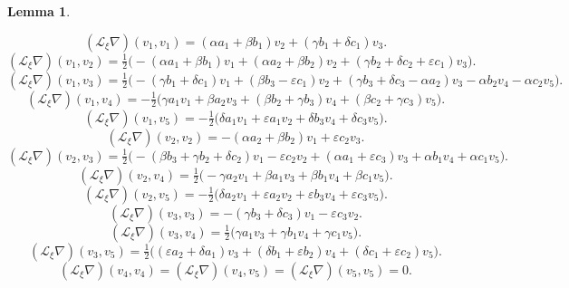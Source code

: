 \documentclass[10pt]{article}
\newtheorem{Lemma}{Lemma}
\begin{document}
\begin{Lemma}
\begin{enumerate}
\begin{equation}
(\mathscr{L}_\xi\nabla) (v_1,v_1)=(\alpha a_1+\beta b_1)v_2+(\gamma b_1+\delta c_1)v_3.\label{A(v_1,v_1)}    
\end{equation} 
\begin{equation}
 (\mathscr{L}_\xi\nabla) (v_1,v_2)=\tfrac{1}{2}\Big(-(\alpha a_1+\beta b_1)v_1+(\alpha a_2+\beta b_2)v_2+(\gamma b_2+\delta c_2+\varepsilon c_1)v_3\Big).   
\end{equation}
\begin{equation}
(\mathscr{L}_\xi\nabla) (v_1,v_3)=\tfrac{1}{2}\Big(-(\gamma b_1 +\delta c_1)v_1+(\beta b_3-\varepsilon c_1)v_2+(\gamma b_3+\delta c_3-\alpha a_2)v_3-\alpha b_2v_4-\alpha c_2 v_5\Big).\label{A(v_1,v_3)}
\end{equation}
\begin{equation}
 (\mathscr{L}_\xi\nabla) (v_1,v_4)=-\tfrac{1}{2}\Big(\gamma a_1 v_1+\beta a_2v_3+(\beta b_2+\gamma b_3)v_4+(\beta c_2+\gamma c_3) v_5\Big).   
\end{equation}
\begin{equation}   
(\mathscr{L}_\xi\nabla) (v_1,v_5)=-\tfrac{1}{2}\Big(\delta a_1 v_1+\varepsilon a_1v_2+\delta b_3v_4+\delta c_3v_5\Big).
\end{equation} 
\begin{equation}
    (\mathscr{L}_\xi\nabla) (v_2,v_2)=-(\alpha a_2+\beta b_2)v_1+\varepsilon c_2 v_3.\label{A(v_2,v_2)}
\end{equation}
\begin{equation}
    (\mathscr{L}_\xi\nabla) (v_2,v_3)=\tfrac{1}{2}\Big(-(\beta b_3+\gamma b_2+\delta c_2)v_1-\varepsilon c_2v_2+(\alpha a_1+\varepsilon c_3)v_3+\alpha b_1 v_4+\alpha c_1v_5\Big).
\end{equation}
\begin{equation}
    (\mathscr{L}_\xi\nabla) (v_2,v_4)=\tfrac{1}{2}\Big(-\gamma a_2v_1+\beta a_1v_3+\beta b_1v_4+\beta c_1v_5\Big).
\end{equation}
\begin{equation}
    (\mathscr{L}_\xi\nabla) (v_2,v_5)=-\tfrac{1}{2}\Big(\delta a_2 v_1+\varepsilon a_2v_2+\varepsilon b_3 v_4 +\varepsilon c_3v_5\Big).
\end{equation} 
\begin{equation}
    (\mathscr{L}_\xi\nabla) (v_3,v_3)=-(\gamma b_3+\delta c_3)v_1-\varepsilon c_3v_2.\label{A(v_3,v_3)}
\end{equation} 
\begin{equation}
    (\mathscr{L}_\xi\nabla) (v_3,v_4)=\tfrac{1}{2}\Big(\gamma a_1 v_3+\gamma b_1 v_4+\gamma c_1 v_5\Big).
\end{equation}
\begin{equation}
    (\mathscr{L}_\xi\nabla) (v_3,v_5)=\tfrac{1}{2}\Big((\varepsilon a_2 +\delta a_1)v_3+(\delta b_1+\varepsilon b_2)v_4+ (\delta c_1+\varepsilon c_2)v_5\Big).
\end{equation}
\begin{equation}
    (\mathscr{L}_\xi\nabla) (v_4,v_4)= 
(\mathscr{L}_\xi\nabla) (v_4,v_5)= 
(\mathscr{L}_\xi\nabla) (v_5,v_5)=0.\label{A(v_5,v_5)}
\end{equation}


\end{enumerate}
\end{Lemma}
\end{document}
